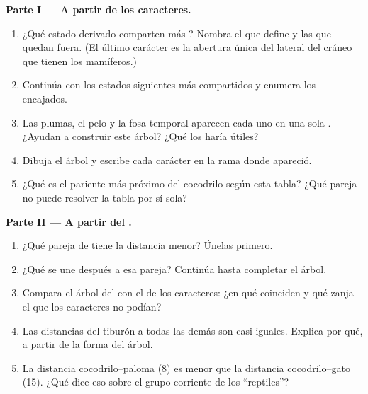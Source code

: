 \begin{problem}
\medskip
\noindent\textbf{Parte I --- A partir de los caracteres.}
\begin{enumerate}
  \item ¿Qué estado derivado comparten más ? Nombra el 
        que define y las  que quedan fuera. (El último carácter
        es la abertura única del lateral del cráneo que tienen los
        mamíferos.)
  \item Continúa con los estados siguientes más compartidos y enumera
        los  encajados.
  \item Las plumas, el pelo y la fosa temporal aparecen cada uno en una
        sola . ¿Ayudan a construir este árbol? ¿Qué los haría
        útiles?
  \item Dibuja el árbol y escribe cada carácter en la rama donde
        apareció.
  \item ¿Qué  es el pariente más próximo del cocodrilo según
        esta tabla? ¿Qué pareja no puede resolver la tabla por sí sola?
\end{enumerate}

\medskip
\noindent\textbf{Parte II --- A partir del .}
\begin{enumerate}[resume]
  \item ¿Qué pareja de  tiene la distancia menor? Únelas
        primero.
  \item ¿Qué  se une después a esa pareja? Continúa hasta
        completar el árbol.
  \item Compara el árbol del  con el de los caracteres: ¿en qué
        coinciden y qué zanja el  que los caracteres no podían?
  \item Las distancias del tiburón a todas las demás son casi iguales.
        Explica por qué, a partir de la forma del árbol.
  \item La distancia cocodrilo--paloma (8) es menor que la distancia
        cocodrilo--gato (15). ¿Qué dice eso sobre el grupo corriente de
        los ``reptiles''?
\end{enumerate}


\end{problem}
